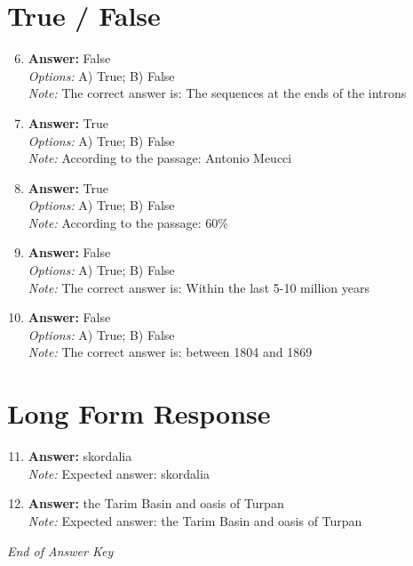 \documentclass[12pt]{article}
\begin{document}
\section*{True / False}
\begin{enumerate}[label=\arabic*.]
\setcounter{enumi}{5}
\item \textbf{Answer:} False
\\ \textit{Options:} A) True; B) False
\\ \textit{Note:} The correct answer is: The sequences at the ends of the introns
\item \textbf{Answer:} True
\\ \textit{Options:} A) True; B) False
\\ \textit{Note:} According to the passage: Antonio Meucci
\item \textbf{Answer:} True
\\ \textit{Options:} A) True; B) False
\\ \textit{Note:} According to the passage: 60\%
\item \textbf{Answer:} False
\\ \textit{Options:} A) True; B) False
\\ \textit{Note:} The correct answer is: Within the last 5-10 million years
\item \textbf{Answer:} False
\\ \textit{Options:} A) True; B) False
\\ \textit{Note:} The correct answer is: between 1804 and 1869
\end{enumerate}

\section*{Long Form Response}
\begin{enumerate}[label=\arabic*.]
\setcounter{enumi}{10}
\item \textbf{Answer:} skordalia
\\ \textit{Note:} Expected answer: skordalia
\item \textbf{Answer:} the Tarim Basin and oasis of Turpan
\\ \textit{Note:} Expected answer: the Tarim Basin and oasis of Turpan
\end{enumerate}

\vfill
\noindent\textit{End of Answer Key}
\end{document}
